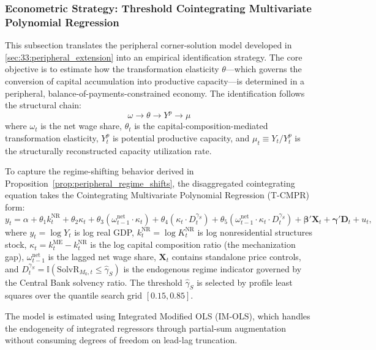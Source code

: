 
\subsubsection{Econometric Strategy: Threshold Cointegrating Multivariate Polynomial Regression}
\label{sec:441:chile_strategy}

This subsection translates the peripheral corner-solution model developed in \cref{sec:33:peripheral_extension} into an empirical identification strategy. The core objective is to estimate how the transformation elasticity $\theta$---which governs the conversion of capital accumulation into productive capacity---is determined in a peripheral, balance-of-payments-constrained economy. The identification follows the structural chain:
\begin{equation}
	\omega \longrightarrow \theta \longrightarrow Y^p \longrightarrow \mu
	\label{eq:441:ident_chain}
\end{equation}
where $\omega_t$ is the net wage share, $\theta_t$ is the capital-composition-mediated transformation elasticity, $Y^p_t$ is potential productive capacity, and $\mu_t \equiv Y_t / Y^p_t$ is the structurally reconstructed capacity utilization rate.

To capture the regime-shifting behavior derived in Proposition~\ref{prop:peripheral_regime_shifts}, the disaggregated cointegrating equation takes the Cointegrating Multivariate Polynomial Regression (T-CMPR) form:
\begin{equation}
	y_t = \alpha + \theta_1 k^{\text{NR}}_t + \theta_2 \kappa_t + \theta_3 (\omega^{\text{net}}_{t-1} \cdot \kappa_t) + \theta_4 (\kappa_t \cdot D^{\gamma_S}_t) + \theta_5 (\omega^{\text{net}}_{t-1} \cdot \kappa_t \cdot D^{\gamma_S}_t) + \boldsymbol{\beta}' \mathbf{X}_t + \boldsymbol{\gamma}' \mathbf{D}_t + u_t,
	\label{eq:441:chile_cmpr_model}
\end{equation}
where $y_t = \log Y_t$ is log real GDP, $k^{\text{NR}}_t = \log K^{\text{NR}}_t$ is log nonresidential structures stock, $\kappa_t = k^{\text{ME}}_t - k^{\text{NR}}_t$ is the log capital composition ratio (the mechanization gap), $\omega^{\text{net}}_{t-1}$ is the lagged net wage share, $\mathbf{X}_t$ contains standalone price controls, and $D^{\gamma_S}_t = \mathbb{I}(\text{SolvR}_{M_0,t} \leq \hat{\gamma}_S)$ is the endogenous regime indicator governed by the Central Bank solvency ratio. The threshold $\hat{\gamma}_S$ is selected by profile least squares over the quantile search grid $[0.15, 0.85]$.

The model is estimated using \citet{VogelsangWagner2024} Integrated Modified OLS (IM-OLS), which handles the endogeneity of integrated regressors through partial-sum augmentation without consuming degrees of freedom on lead-lag truncation.


